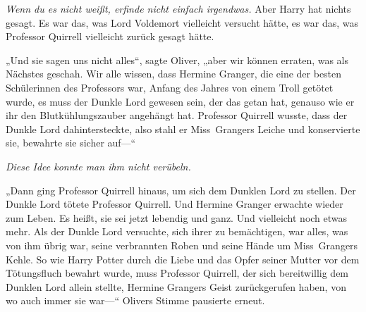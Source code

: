 \emph{Wenn du es nicht weißt, erfinde nicht einfach irgendwas.}
Aber Harry hat nichts gesagt. Es war das, was Lord Voldemort vielleicht versucht hätte, es war das, was Professor Quirrell vielleicht zurück gesagt hätte.

„Und sie sagen uns nicht alles“, sagte Oliver, „aber wir können erraten, was als Nächstes geschah. Wir alle wissen, dass Hermine Granger, die eine der besten Schülerinnen des Professors war, Anfang des Jahres von einem Troll getötet wurde, es muss der Dunkle Lord gewesen sein, der das getan hat, genauso wie er ihr den Blutkühlungszauber angehängt hat. Professor Quirrell wusste, dass der Dunkle Lord dahintersteckte, also stahl er Miss~Grangers Leiche und konservierte sie, bewahrte sie sicher auf—“

\emph{Diese Idee konnte man ihm nicht verübeln.}

„Dann ging Professor Quirrell hinaus, um sich dem Dunklen Lord zu stellen. Der Dunkle Lord tötete Professor Quirrell. Und Hermine Granger erwachte wieder zum Leben. Es heißt, sie sei jetzt lebendig und ganz. Und vielleicht noch etwas mehr. Als der Dunkle Lord versuchte, sich ihrer zu bemächtigen, war alles, was von ihm übrig war, seine verbrannten Roben und seine Hände um Miss~Grangers Kehle. So wie Harry Potter durch die Liebe und das Opfer seiner Mutter vor dem Tötungsfluch bewahrt wurde, muss Professor Quirrell, der sich bereitwillig dem Dunklen Lord allein stellte, Hermine Grangers Geist zurückgerufen haben, von wo auch immer sie war—“
Olivers Stimme pausierte erneut.

